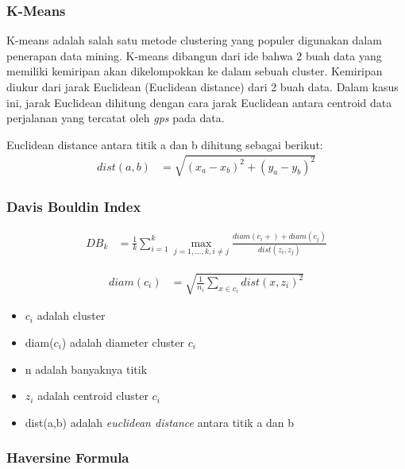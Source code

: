\documentclass{article}
\begin{document}
\subsubsection{K-Means}
\begin{adjustwidth}{4em}{0pt}

\hspace{\parindent}K-means adalah salah satu metode clustering yang populer digunakan dalam penerapan data mining. K-means dibangun dari ide bahwa 2 buah data yang memiliki kemiripan akan dikelompokkan ke dalam sebuah cluster. Kemiripan diukur dari jarak Euclidean (Euclidean distance) dari 2 buah data. Dalam kasus ini, jarak Euclidean dihitung dengan cara jarak Euclidean antara centroid data perjalanan yang tercatat oleh \textit{gps} pada data.

Euclidean distance antara titik a dan b dihitung sebagai berikut:
\begin{align*}
	dist(a,b) &= \sqrt{(x_{a} - x_{b})^2 + (y_{a} - y_{b})^2}
\end{align*}

\end{adjustwidth}

\subsubsection{Davis Bouldin Index}

\begin{align*}
DB_{k} &= \frac{1}{k}\sum\limits_{i=1}^k
\max\limits_{j=1,...,k,i\neq j}\frac{diam(c_i +) + diam(c_j)}{dist(z_i,z_j)}
\end{align*}

\begin{align*}
diam(c_i) &= \sqrt{\frac{1}{n_i}\sum\limits_{x\in c_i}dist(x,z_i)^2}
\end{align*}

\begin{itemize}
	\setlength{\itemindent}{1cm}
	\item{$c_i$ adalah cluster}
	\item{diam($c_i$) adalah diameter cluster $c_i$}
	\item{n adalah banyaknya titik}
	\item{$z_i$ adalah centroid cluster $c_i$}
	\item{dist(a,b) adalah \textit{euclidean distance} antara titik a dan b}
\end{itemize}

\subsubsection{Haversine Formula}
\end{document}
